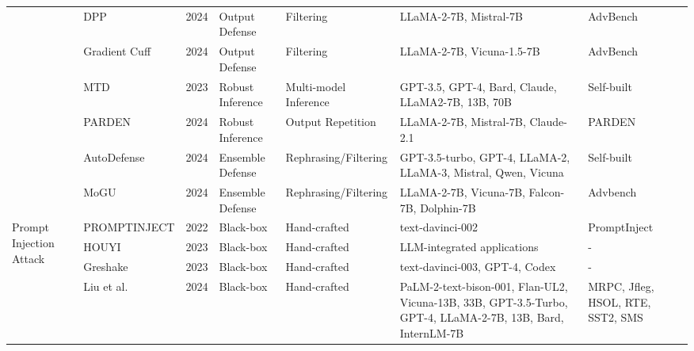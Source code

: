 \begin{table*}[htp]
{\begin{tabular}{p{}p{}p{}p{}p{}p{}p{}}
& \cellcolor{gray!15!}DPP~\cite{xiong2024defensive} & \cellcolor{gray!15!}2024 & \cellcolor{gray!15!}Output Defense& \cellcolor{gray!15!}Filtering & \cellcolor{gray!15!}LLaMA-2-7B, Mistral-7B & \cellcolor{gray!15!}AdvBench \\
& \cellcolor{white}Gradient Cuff~\cite{hu2024gradient} & \cellcolor{white}2024 & \cellcolor{white}Output Defense & \cellcolor{white}Filtering & \cellcolor{white}LLaMA-2-7B, Vicuna-1.5-7B & \cellcolor{white}AdvBench \\
& \cellcolor{gray!15!}MTD~\cite{chen2023jailbreaker} & \cellcolor{gray!15!}2023 & \cellcolor{gray!15!}Robust Inference& \cellcolor{gray!15!}Multi-model Inference & \cellcolor{gray!15!}GPT-3.5, GPT-4, Bard, Claude, LLaMA2-7B, 13B, 70B & \cellcolor{gray!15!}Self-built \\
& \cellcolor{white}PARDEN~\cite{zhang2024parden} & \cellcolor{white}2024 & \cellcolor{white}Robust Inference& \cellcolor{white}Output Repetition & \cellcolor{white}LLaMA-2-7B, Mistral-7B, Claude-2.1 & \cellcolor{white}PARDEN \\
& \cellcolor{gray!15!}AutoDefense~\cite{lu2024autojailbreak} & \cellcolor{gray!15!}2024 & \cellcolor{gray!15!}Ensemble Defense & \cellcolor{gray!15!}Rephrasing/Filtering & \cellcolor{gray!15!}GPT-3.5-turbo, GPT-4, LLaMA-2, LLaMA-3, Mistral, Qwen, Vicuna & \cellcolor{gray!15!}Self-built  \\
& \cellcolor{white}MoGU~\cite{du2024mogu} & \cellcolor{white}2024 & \cellcolor{white}Ensemble Defense & \cellcolor{white}Rephrasing/Filtering & \cellcolor{white}LLaMA-2-7B, Vicuna-7B, Falcon-7B, Dolphin-7B & \cellcolor{white}Advbench \\
\hline
\multirow{10}{0.1\textwidth}{Prompt Injection Attack} & \cellcolor{gray!15!}PROMPTINJECT\cite{perez2022ignore} & \cellcolor{gray!15!}2022 & \cellcolor{gray!15!}Black-box & \cellcolor{gray!15!}Hand-crafted & \cellcolor{gray!15!}text-davinci-002 & \cellcolor{gray!15!}PromptInject \\
& \cellcolor{white}HOUYI~\cite{liu2023prompt} & \cellcolor{white}2023 & \cellcolor{white}Black-box & \cellcolor{white}Hand-crafted & \cellcolor{white}LLM-integrated applications & \cellcolor{white}- \\
& \cellcolor{gray!15!}Greshake~\cite{greshake2023not} & \cellcolor{gray!15!}2023 & \cellcolor{gray!15!}Black-box & \cellcolor{gray!15!}Hand-crafted & \cellcolor{gray!15!}text-davinci-003, GPT-4, Codex & \cellcolor{gray!15!}-  \\
& \cellcolor{white}Liu et al. \cite{liu2024formalizing} & \cellcolor{white}2024 & \cellcolor{white}Black-box & \cellcolor{white}Hand-crafted & \cellcolor{white}PaLM-2-text-bison-001, Flan-UL2, Vicuna-13B, 33B, GPT-3.5-Turbo, GPT-4, LLaMA-2-7B, 13B, Bard, InternLM-7B & \cellcolor{white}MRPC, Jfleg, HSOL, RTE, SST2, SMS

\end{tabular}}
\end{table*}

